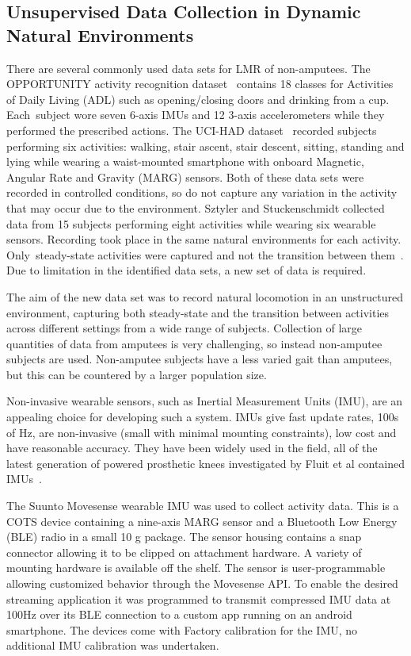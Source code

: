 \subsection{Unsupervised Data Collection in Dynamic Natural Environments}
\label{sec:data_collection}
There are several commonly used data sets for LMR of non-amputees. The OPPORTUNITY activity recognition dataset~\cite{roggan2010} contains 18  classes for Activities of Daily Living (ADL) such as opening/closing doors and drinking from a cup. Each~subject wore seven 6-axis IMUs and 12 3-axis accelerometers while they performed the prescribed actions. The UCI-HAD dataset~\cite{Anguita2013} recorded subjects performing six activities: walking, stair ascent, stair descent, sitting, standing and lying while wearing a waist-mounted smartphone with onboard Magnetic, Angular Rate and Gravity (MARG) sensors. Both of these data sets were recorded in controlled conditions, so do not capture any variation in the activity that may occur due to the environment. Sztyler and Stuckenschmidt collected data from 15 subjects performing eight activities while wearing six wearable sensors. Recording took place in the same natural environments for each activity. Only~steady-state activities were captured and not the transition between them~\cite{Sztyler2017}. Due to limitation in the identified data sets, a new set of data is required. 

The aim of the new data set was to record natural locomotion in an unstructured environment, capturing both steady-state and the transition between activities across different settings from a wide range of subjects. Collection of large quantities of data from amputees is very challenging, so instead non-amputee subjects are used. Non-amputee subjects have a less varied gait than amputees, but this can be countered by a larger population size.

Non-invasive wearable sensors, such as Inertial Measurement Units (IMU), are an appealing choice for developing such a system. IMUs give fast update rates, 100s of Hz, are non-invasive (small with minimal mounting constraints), low cost and have reasonable accuracy. They have been widely used in the field, all of the latest generation of powered prosthetic knees investigated by Fluit et al contained IMUs~\cite{Fluit2020}.

The Suunto Movesense wearable IMU was used to collect activity data. This is a COTS device containing a nine-axis MARG sensor and a Bluetooth Low Energy (BLE) radio in a small 10 g package. The sensor housing contains a snap connector allowing it to be clipped on attachment hardware. A variety of mounting hardware is available off the shelf. The sensor is user-programmable allowing customized behavior through the Movesense API. To enable the desired streaming application it was programmed to transmit compressed IMU data at 100Hz over its BLE connection to a custom app running on an android smartphone. The devices come with Factory calibration for the IMU, no additional IMU calibration was undertaken.

